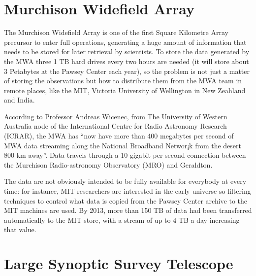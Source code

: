 


\section{Murchison Widefield Array} %
\label{sec:murchison_widefield_array}

The Murchison Widefield Array is
one of %
the first Square Kilometre Array precursor to enter full operations, generating a huge amount of information that needs to be stored for later retrieval by scientists. To store the data generated by the MWA three 1 TB hard drives every two hours are needed (it will store about 3 Petabytes at the Pawsey Center each year), so the
problem is not %
just a matter of storing the observations but how to distribute them from the MWA team in remote places, like
the MIT, %
Victoria University of Wellington in New Zeahland and India. 

According to Professor Andreas Wicenec, from The University of Western Australia node of the International Centre for Radio Astronomy Research (ICRAR),
the MWA %
has ``now have more than 400 megabytes per second of MWA data streaming along the National Broadband Networ¡k from the desert 800 km away''. Data travels through a 10 gigabit per second connection between the Murchison Radio-astronomy Observatory (MRO) and
Geraldton.

The data are not obviously intended to be fully available for everybody at every time: for instance, MIT researchers are interested in the early universe so filtering techniques to control what data is copied from the Pawsey Center archive to the MIT machines are used. By 2013, more than 150 TB of data had been transferred automatically to the MIT store, with a stream of up to 4 TB a day increasing that value. 




\section{Large Synoptic Survey Telescope} %
\label{sec:large_synoptic_survey_telescope}

